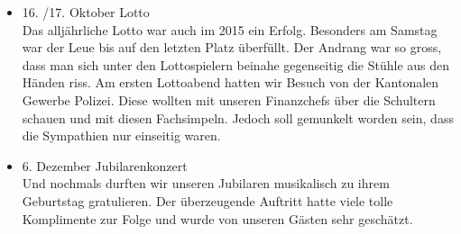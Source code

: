 \begin{history}
\begin{itemize}
            \item 16. /17. Oktober Lotto\\
                  Das alljährliche Lotto war auch im 2015 ein Erfolg. Besonders
                  am Samstag war der Leue bis auf den letzten Platz überfüllt.
                  Der Andrang war so gross, dass man sich unter den
                  Lottospielern beinahe gegenseitig die Stühle aus den Händen
                  riss. Am ersten Lottoabend hatten wir Besuch von der
                  Kantonalen Gewerbe Polizei. Diese wollten mit unseren
                  Finanzchefs über die Schultern schauen und mit diesen
                  Fachsimpeln. Jedoch soll gemunkelt worden sein, dass die
                  Sympathien nur einseitig waren.

            \item 6. Dezember Jubilarenkonzert\\
                  Und nochmals durften wir unseren Jubilaren musikalisch zu
                  ihrem Geburtstag gratulieren. Der überzeugende Auftritt hatte
                  viele tolle Komplimente zur Folge und wurde von unseren Gästen
                  sehr geschätzt.

      \end{itemize}

\end{history}
